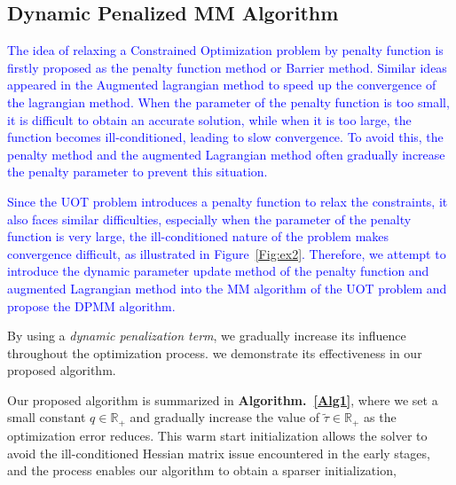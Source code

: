 \documentclass[conference]{IEEEtran}
\newcommand{\R}{\mathbb{R}}
\newcommand{\changeSX}[1]{\textcolor{blue}{#1}}
\begin{document}
\subsection{Dynamic Penalized MM Algorithm}
\changeSX{The idea of relaxing a Constrained Optimization problem by penalty function is firstly proposed as the penalty function method or Barrier method. Similar ideas appeared in the Augmented lagrangian method to speed up the convergence of the lagrangian method. When the parameter of the penalty function is too small, it is difficult to obtain an accurate solution, while when it is too large, the function becomes ill-conditioned, leading to slow convergence. To avoid this, the penalty method \cite{349995, adaptive_p} and the augmented Lagrangian method \cite{doi:10.1137/1.9781611973365} often gradually increase the penalty parameter to prevent this situation.}

\changeSX{Since the UOT problem introduces a penalty function to relax the constraints, it also faces similar difficulties, especially when the parameter of the penalty function is very large, the ill-conditioned nature of the problem makes convergence difficult, as illustrated in Figure~\ref{Fig:ex2}. Therefore, we attempt to introduce the dynamic parameter update method of the penalty function and augmented Lagrangian method into the MM algorithm of the UOT problem and propose the DPMM algorithm.}

By using a {\it dynamic penalization term}, we gradually increase its influence throughout the optimization process. we demonstrate its effectiveness in our proposed algorithm.

Our proposed algorithm is summarized in {\bf Algorithm.~\ref{Alg1}}, where we set a small constant $q \in \R_+ $ and gradually increase the value of $\tilde{\tau}\in \R_+$ as the optimization error reduces. This warm start initialization allows the solver to avoid the ill-conditioned Hessian matrix issue encountered in the early stages, and the process enables our algorithm to obtain a sparser initialization,
\end{document}
